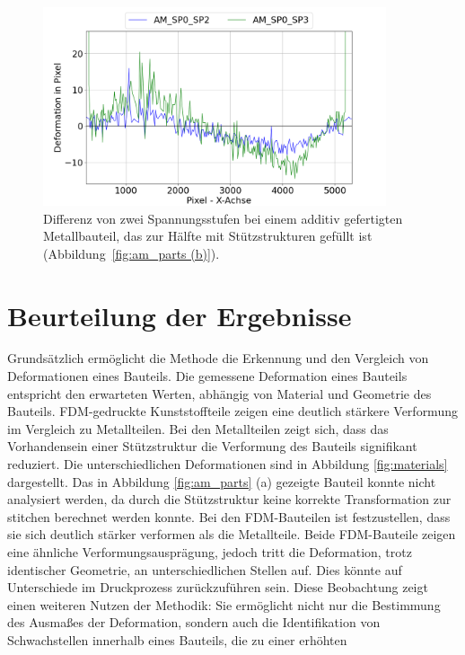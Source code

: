 \begin{figure}[H]
    \centering
    \includegraphics[width=0.9\textwidth]{images/AM_sp0_sp2_defo_plot.png}
    \caption{Differenz von zwei Spannungsstufen bei einem additiv gefertigten Metallbauteil, 
    das zur Hälfte mit Stützstrukturen gefüllt ist (Abbildung~\ref{fig:am_parts (b)}). }
    \label{fig:deformation_data_am}
\end{figure}

\section{Beurteilung der Ergebnisse}

Grundsätzlich ermöglicht die Methode die Erkennung und den Vergleich von Deformationen 
eines Bauteils. Die gemessene Deformation eines Bauteils entspricht den erwarteten Werten, 
abhängig von Material und Geometrie des Bauteils. FDM-gedruckte Kunststoffteile zeigen 
eine deutlich stärkere Verformung im Vergleich zu Metallteilen.
Bei den Metallteilen zeigt sich, dass das Vorhandensein einer Stützstruktur die
Verformung des Bauteils signifikant reduziert. 
Die unterschiedlichen Deformationen sind in Abbildung \ref{fig:materials} dargestellt. 
Das in Abbildung \ref{fig:am_parts} (a) gezeigte Bauteil konnte nicht analysiert werden, 
da durch die Stützstruktur keine korrekte Transformation zur stitchen berechnet werden konnte.
Bei den FDM-Bauteilen ist festzustellen, dass sie sich deutlich stärker verformen 
als die Metallteile. Beide FDM-Bauteile zeigen eine ähnliche Verformungsausprägung, 
jedoch tritt die Deformation, trotz identischer Geometrie, an unterschiedlichen Stellen auf. 
Dies könnte auf Unterschiede im Druckprozess zurückzuführen sein. 
Diese Beobachtung zeigt einen weiteren Nutzen der Methodik: Sie ermöglicht
nicht nur die Bestimmung des Ausmaßes der Deformation, sondern auch die 
Identifikation von Schwachstellen innerhalb eines Bauteils, die zu einer erhöhten 
 
